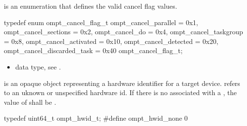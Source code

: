 
\label{sec:ompt_cancel_flag_t}
 is an enumeration that defines the valid cancel flag values.


\begin{ccppspecific}
\begin{omptEnum}
typedef enum ompt_cancel_flag_t {
  ompt_cancel_parallel       = 0x1,
  ompt_cancel_sections       = 0x2,
  ompt_cancel_do             = 0x4,
  ompt_cancel_taskgroup      = 0x8,
  ompt_cancel_activated      = 0x10,
  ompt_cancel_detected       = 0x20,
  ompt_cancel_discarded_task = 0x40
} ompt_cancel_flag_t;
\end{omptEnum}
\end{ccppspecific}


\crossreferences
\begin{itemize}
\item {} data type, see .
\end{itemize}


\label{sec:ompt_hwid_t}
 is an opaque object representing a hardware identifier for a target device.
\label{sec:ompt_hwid_none}
 refers to an uknown or unspecified hardware id.
If there is no  associated with a
, the value of  shall be
.


\begin{ccppspecific}
\begin{omptOther}
typedef uint64_t ompt_hwid_t;
#define ompt_hwid_none 0
\end{omptOther}
\end{ccppspecific}




